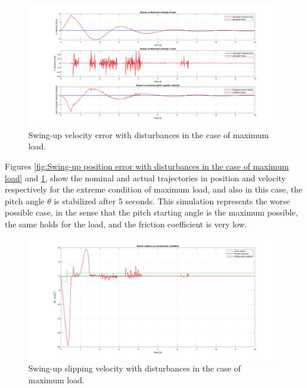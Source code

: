 \begin{figure}
    \centering
    \includegraphics[width=1\linewidth]{Images/Robustness analysis/maximum load/Swing-Up/Velocity_error.jpg}
    \caption{Swing-up velocity error with disturbances in the case of maximum load.}
    \label{fig:Swing-up velocity error with disturbances in the case of maximum load}
\end{figure}

Figures \ref{fig:Swing-up position error with disturbances in the case of maximum load} and \ref{fig:Swing-up velocity error with disturbances in the case of maximum load}, show the nominal and actual trajectories in position and velocity respectively for the extreme condition of maximum load, and also in this case, the pitch angle $\theta$ is stabilized after 5 seconds.
This simulation represents the worse possible case, in the sense that the pitch starting angle is the maximum possible, the same holds for the load, and the friction coefficient is very low.   

\begin{figure}
    \centering
    \includegraphics[width=1\linewidth]{Images/Robustness analysis/maximum load/Swing-Up/Slipping_velocity.jpg}
    \caption{Swing-up slipping velocity with disturbances in the case of maximum load.}
    \label{fig:Swing-up slipping velocity with disturbances in the case of maximum load}
\end{figure}

